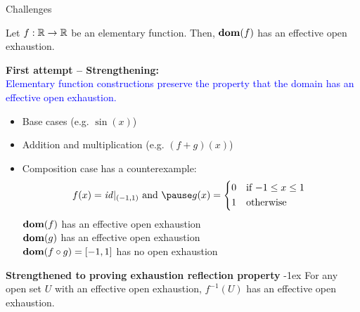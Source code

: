\begin{frame}{Challenges}
    \vspace{-1.5em}
    \begin{theorem}
        Let $f:\mathbb{R}\to\mathbb{R}$ be an elementary function. Then, $\mathbf{dom}(f)$ has an effective open exhaustion.
    \end{theorem}
    \pause
    \vspace{-2em}
    \begin{minipage}[t]{0.52\linewidth}
        \begin{exampleblock}{\textbf{\textcolor{Mahogany}{First attempt --  Strengthening:}}\\ \textcolor{Blue}{Elementary function constructions preserve
        the property that the domain has an effective open exhaustion.}}
            \begin{itemize}
            \setlength\itemsep{-2pt}
                \pause\item Base cases \Checkmark (e.g. $\sin(x)$)
                \pause\item Addition and multiplication \Checkmark (e.g. $(f+g)(x)$) 
                \pause \item Composition case has a counterexample:
                \pause \[ f(x) = \mathit{id}|_{(-1,1)}\text{ and } \pause  g(x) = 
                        \begin{cases*}
                            0 & if $-1\leq x \leq 1$ \\
                            1 & otherwise
                        \end{cases*}
                \]
                \pause$\mathbf{dom}(f)$ has an effective open exhaustion \Checkmark\\
                \pause$\mathbf{dom}(g)$ has an effective open exhaustion \Checkmark\\
                \pause$\mathbf{dom}(f\circ g) = [-1,1]$ has no open exhaustion \textcolor{Mahogany}{\XSolidBrush}
            \end{itemize}
        \end{exampleblock}
    \end{minipage}
    \hspace{1em}
    \pause
    \begin{minipage}[t]{0.44\linewidth}
        \begin{exampleblock}{\textbf{\textcolor{BrickRed}{Strengthened to proving \textbf{exhaustion reflection property}}}}
            \kern-1ex
            For any open set $U$ with an effective open exhaustion, $f^{-1}(U)$ has an effective open exhaustion.\\

\end{exampleblock}
\end{minipage}
\end{frame}
